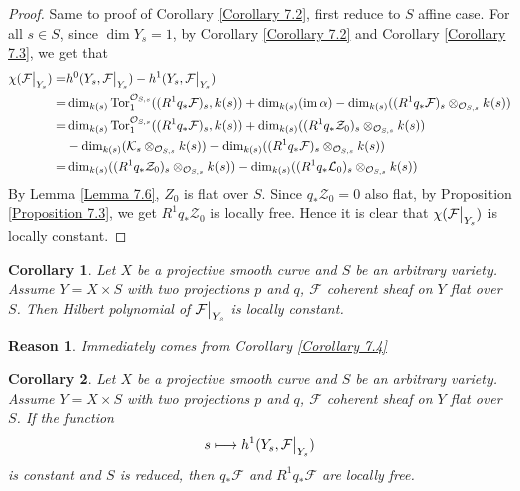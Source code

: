 \documentclass{ctexart}
\newtheorem{reason}{Reason}[section]
\newtheorem{corollary}{Corollary}[section]
\newcommand{\im}{\operatorname{im}}
\newcommand{\tor}{\operatorname{Tor}}
\begin{document}
\begin{proof}
    Same to proof of Corollary \ref{Corollary 7.2}, first reduce to $S$ affine case.
    For all $s\in S$, since $\dim Y_{s} = 1$, by Corollary \ref{Corollary 7.2} and Corollary \ref{Corollary 7.3}, we get that
    \begin{equation}
        \begin{split}
            \chi(\mathcal{F}\big{|}_{Y_{s}}) = & h^{0}(Y_{s}, \mathcal{F}\big{|}_{Y_{s}}) - h^{1}(Y_{s}, \mathcal{F}\big{|}_{Y_{s}}) \\
            = & \dim_{k(s)} \tor_{1}^{\mathcal{O}_{S, s}}((R^{1}q_{\ast}\mathcal{F})_{s}, k(s)) + \dim_{k(s)} (\im \alpha) - \dim_{k(s)} ((R^{1}q_{\ast}\mathcal{F})_{s} \otimes_{\mathcal{O}_{S, s}} k(s)) \\
            = & \dim_{k(s)} \tor_{1}^{\mathcal{O}_{S, s}}((R^{1}q_{\ast}\mathcal{F})_{s}, k(s)) + \dim_{k(s)} ((R^{1}q_{\ast}\mathcal{Z}_{0})_{s} \otimes_{\mathcal{O}_{S, s}} k(s)) \\
            & - \dim_{k(s)} (\mathcal{K}_{s} \otimes_{\mathcal{O}_{S, s}} k(s)) - \dim_{k(s)} ((R^{1}q_{\ast}\mathcal{F})_{s} \otimes_{\mathcal{O}_{S, s}} k(s)) \\
            = & \dim_{k(s)} ((R^{1}q_{\ast}\mathcal{Z}_{0})_{s} \otimes_{\mathcal{O}_{S, s}} k(s)) - \dim_{k(s)} ((R^{1}q_{\ast}\mathcal{L}_{0})_{s} \otimes_{\mathcal{O}_{S, s}} k(s))
        \end{split}
    \end{equation}
    By Lemma \ref{Lemma 7.6}, $Z_{0}$ is flat over $S$.
    Since $q_{\ast}\mathcal{Z}_{0} = 0$ also flat, by Proposition \ref{Proposition 7.3}, we get $R^{1}q_{\ast}\mathcal{Z}_{0}$ is locally free.
    Hence it is clear that $\chi(\mathcal{F}\big{|}_{Y_{s}})$ is locally constant.
\end{proof}
\begin{corollary}
    Let $X$ be a projective smooth curve and $S$ be an arbitrary variety.
    Assume $Y = X \times S$ with two projections $p$ and $q$, $\mathcal{F}$ coherent sheaf on $Y$ flat over $S$.
    Then Hilbert polynomial of $\mathcal{F}\big{|}_{Y_{s}}$ is locally constant.
    \label{Corollary 7.5}
\end{corollary}
\begin{reason}
    Immediately comes from Corollary \ref{Corollary 7.4}
\end{reason}
\begin{corollary}
    Let $X$ be a projective smooth curve and $S$ be an arbitrary variety.
    Assume $Y = X \times S$ with two projections $p$ and $q$, $\mathcal{F}$ coherent sheaf on $Y$ flat over $S$.
    If the function
    \begin{equation}
        s \longmapsto h^{1}(Y_{s}, \mathcal{F}\big{|}_{Y_{s}})
    \end{equation} 
    is constant and $S$ is reduced, then $q_{\ast}\mathcal{F}$ and $R^{1}q_{\ast}\mathcal{F}$ are locally free.
    \label{Corollary 7.6}
\end{corollary}
\end{document}
